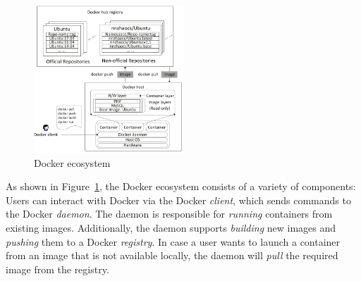 \begin{figure}
	\centering
	\includegraphics[width=0.5\textwidth]{graphs/fig-docker-architecture}
	\caption{Docker ecosystem }\label{fig-docker-architecture}
\end{figure}

As shown in Figure~\ref{fig-docker-architecture}, the Docker ecosystem consists
of a variety of components:
%
Users can interact with Docker via the Docker \emph{client}, which sends commands
to the Docker \emph{daemon}. The daemon is responsible for \emph{running} containers
from existing images. Additionally, the daemon supports \emph{building} new images and
\emph{pushing} them to a Docker \emph{registry}. In case a user wants to launch a
container from an image that is not available locally, the daemon will \emph{pull}
the required image from the registry.



